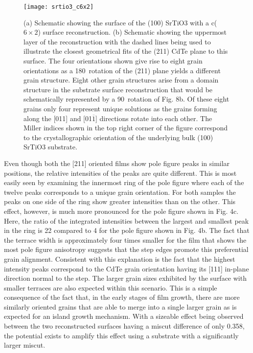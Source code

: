 \begin{figure}
    \centering
    \texttt{[image: srtio3\_c6x2]}
    \caption{\label{fig:srtio3_c6x2}(a) Schematic showing the surface of the (100) SrTiO3 with a c($6\times2$) surface reconstruction. (b) Schematic showing the uppermost layer of the reconstruction with the
        dashed lines being used to illustrate the closest geometrical fits of the (211) CdTe plane to this surface. The four orientations shown give rise to eight grain orientations as a
        180\degree~rotation of the (211) plane yields a different grain structure. Eight other grain structures arise from a domain structure in the substrate surface reconstruction that
        would be schematically represented by a 90\degree~rotation of Fig. 8b. Of these eight grains only four represent unique solutions as the grains forming along the [011] and [01$\overline{1}$]
        directions rotate into each other. The Miller indices shown in the top right corner of the figure correspond to the crystallographic orientation of the underlying bulk (100)
        SrTiO3 substrate.}
\end{figure}

Even though both the [211] oriented films show pole figure
peaks in similar positions, the relative intensities of the peaks are
quite different. This is most easily seen by examining the
innermost ring of the pole figure where each of the twelve peaks
corresponds to a unique grain orientation. For both samples the
peaks on one side of the ring show greater intensities than on the
other. This effect, however, is much more pronounced for the pole
figure shown in Fig. 4c. Here, the ratio of the integrated intensities
between the largest and smallest peak in the ring is 22 compared to
4 for the pole figure shown in Fig. 4b. The fact that the terrace
width is approximately four times smaller for the film that shows
the most pole figure anisotropy suggests that the step edges
promote this preferential grain alignment. Consistent with this
explanation is the fact that the highest intensity peaks correspond
to the CdTe grain orientation having its [111] in-plane direction
normal to the step. The larger grain sizes exhibited by the surface
with smaller terraces are also expected within this scenario. This is
a simple consequence of the fact that, in the early stages of film
growth, there are more similarly oriented grains that are able to
merge into a single larger grain as is expected for an island growth
mechanism. With a sizeable effect being observed between the two
reconstructed surfaces having a miscut difference of only 0.358, the
potential exists to amplify this effect using a substrate with a
significantly larger miscut.
